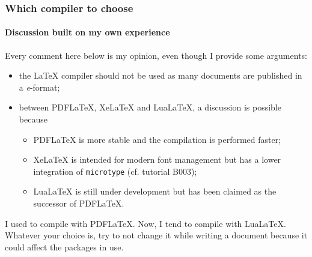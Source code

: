 \documentclass[11pt]{beamer}
\begin{document}
\begin{frame}
	\frametitle{Which compiler to choose}
	\framesubtitle{Discussion built on my own experience}

	Every comment here below is my opinion, even though I provide some arguments:
	\begin{itemize}
		\item the LaTeX compiler should not be used as many documents are published in a \textit{e}-format;
		\item between PDFLaTeX, XeLaTeX and LuaLaTeX, a discussion is possible because
		\begin{itemize}
			\item PDFLaTeX is more stable and the compilation is performed faster;
			\item XeLaTeX is intended for modern font management but has a lower integration of \texttt{microtype} (cf. tutorial B003);
			\item LuaLaTeX is still under development but has been claimed as the successor of PDFLaTeX.
		\end{itemize}
	\end{itemize}

	I used to compile with PDFLaTeX. Now, I tend to compile with LuaLaTeX.
	Whatever your choice is, try to not change it while writing a document because it could affect the packages in use.
\end{frame}


  

\end{document}
